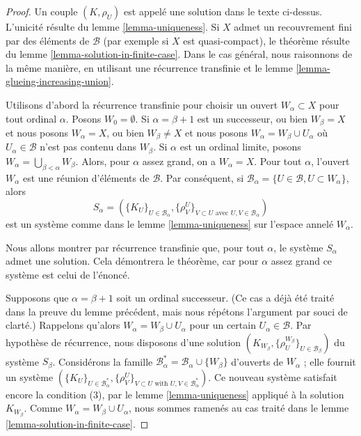 {\begin{theorem}
\end{theorem}

\begin{proof}
Un couple $(K, \rho_U)$ est appelé une solution dans le texte ci-dessus. L'unicité résulte du lemme \ref{lemma-uniqueness}. Si $X$ admet un recouvrement fini par des éléments de $\mathcal{B}$ (par exemple si $X$ est quasi-compact), le théorème résulte du lemme \ref{lemma-solution-in-finite-case}. Dans le cas général, nous raisonnons de la même manière, en utilisant une récurrence transfinie et le lemme \ref{lemma-glueing-increasing-union}.

\medskip\noindent

Utilisons d'abord la récurrence transfinie pour choisir un ouvert $W_\alpha \subset X$
pour tout ordinal $\alpha$. Posons $W_0 = \emptyset$. Si $\alpha = \beta + 1$ est un successeur, ou bien $W_\beta = X$
et nous posons $W_\alpha = X$, ou bien $W_\beta \not = X$ et nous posons
$W_\alpha = W_\beta \cup U_\alpha$ où
$U_\alpha \in \mathcal{B}$ n'est pas contenu dans $W_\beta$. Si $\alpha$ est un ordinal limite, posons
$W_\alpha = \bigcup_{\beta < \alpha} W_\beta$. Alors, pour $\alpha$ assez grand, on a $W_\alpha = X$. Pour tout $\alpha$, l'ouvert $W_\alpha$ est une réunion d'éléments de $\mathcal{B}$. Par conséquent, si
$\mathcal{B}_\alpha = \{U \in \mathcal{B}, U \subset W_\alpha\}$, alors
$$
S_\alpha = (\{K_U\}_{U \in \mathcal{B}_\alpha},
\{\rho_V^U\}_{V \subset U\text{ avec }U, V \in \mathcal{B}_\alpha})
$$
est un système comme dans le lemme \ref{lemma-uniqueness} sur l'espace annelé $W_\alpha$.

\medskip\noindent
Nous allons montrer par récurrence transfinie que, pour tout $\alpha$, le système $S_\alpha$ admet une solution. Cela démontrera le théorème, car pour $\alpha$ assez grand ce système est celui de l'énoncé.

\medskip\noindent
Supposons que $\alpha = \beta + 1$ soit un ordinal successeur. (Ce cas a déjà été traité dans la preuve du lemme précédent, mais nous répétons l'argument par souci de clarté.) Rappelons qu'alors $W_\alpha = W_\beta \cup U_\alpha$ pour un certain $U_\alpha \in \mathcal{B}$. Par hypothèse de récurrence, nous disposons d'une solution $(K_{W_\beta}, \{\rho^{W_\beta}_U\}_{U \in \mathcal{B}_\beta})$ du système $S_\beta$. Considérons la famille $\mathcal{B}_\alpha^* = \mathcal{B}_\alpha \cup \{W_\beta\}$ d'ouverts de $W_\alpha$ ; elle fournit un système $(\{K_U\}_{U \in \mathcal{B}_\alpha^*},
\{\rho_V^U\}_{V \subset U\text{ with }U, V \in \mathcal{B}_\alpha^*})$. Ce nouveau système satisfait encore la condition (3), par le lemme \ref{lemma-uniqueness} appliqué à la solution $K_{W_\beta}$. Comme $W_\alpha = W_\beta \cup U_\alpha$, nous sommes ramenés au cas traité dans le lemme \ref{lemma-solution-in-finite-case}.


\end{proof}}

